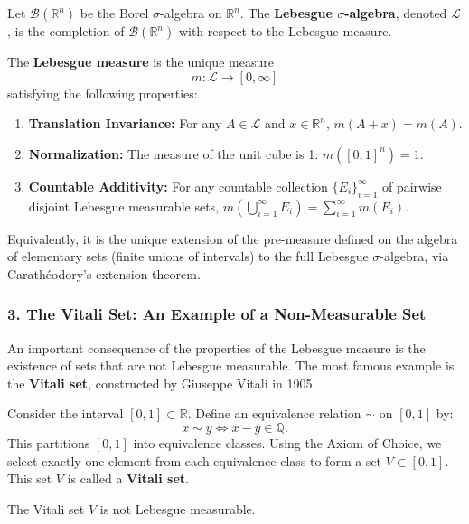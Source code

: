 \documentclass[oneside]{book}
\begin{document}
\begin{definition}
Let \( \mathcal{B}(\mathbb{R}^n) \) be the Borel \(\sigma\)-algebra on \( \mathbb{R}^n \). The \textbf{Lebesgue \(\sigma\)-algebra}, denoted \( \mathcal{L} \), is the completion of \( \mathcal{B}(\mathbb{R}^n) \) with respect to the Lebesgue measure.

The \textbf{Lebesgue measure} is the unique measure
\[
m : \mathcal{L} \to [0, \infty]
\]
satisfying the following properties:
\begin{enumerate}
    \item \textbf{Translation Invariance:} For any \( A \in \mathcal{L} \) and \( x \in \mathbb{R}^n \), \( m(A + x) = m(A) \).
    \item \textbf{Normalization:} The measure of the unit cube is 1: \( m([0,1]^n) = 1 \).
    \item \textbf{Countable Additivity:} For any countable collection \( \{E_i\}_{i=1}^\infty \) of pairwise disjoint Lebesgue measurable sets, \( m\left( \bigcup_{i=1}^\infty E_i \right) = \sum_{i=1}^\infty m(E_i) \).
\end{enumerate}
Equivalently, it is the unique extension of the pre-measure defined on the algebra of elementary sets (finite unions of intervals) to the full Lebesgue \(\sigma\)-algebra, via Carathéodory's extension theorem.
\end{definition}

\subsubsection*{3. The Vitali Set: An Example of a Non-Measurable Set}

An important consequence of the properties of the Lebesgue measure is the existence of sets that are not Lebesgue measurable. The most famous example is the \textbf{Vitali set}, constructed by Giuseppe Vitali in 1905.

\begin{definition}
Consider the interval \([0,1] \subset \mathbb{R}\). Define an equivalence relation \(\sim\) on \([0,1]\) by:
\[
x \sim y \iff x - y \in \mathbb{Q}.
\]
This partitions \([0,1]\) into equivalence classes. Using the Axiom of Choice, we select exactly one element from each equivalence class to form a set \( V \subset [0,1] \). This set \( V \) is called a \textbf{Vitali set}.
\end{definition}

\begin{theorem}
The Vitali set \( V \) is not Lebesgue measurable.
\end{theorem}
\end{document}
